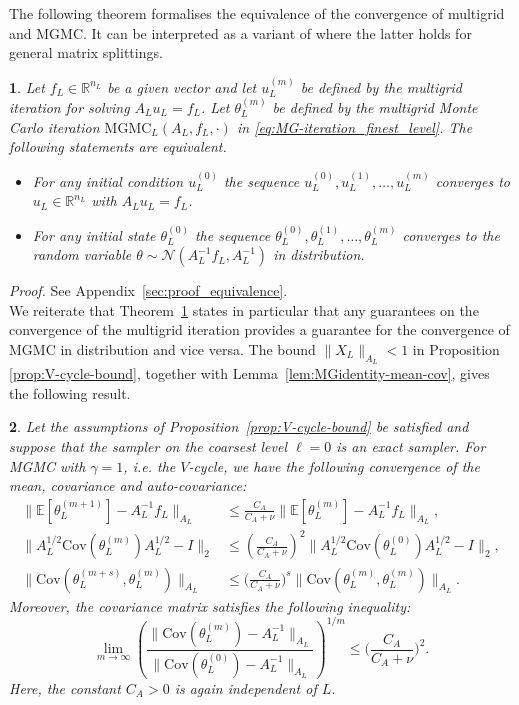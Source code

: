 \documentclass[11pt,english]{article}
\theoremstyle{plain}
\newtheorem{thm}{\protect\theoremname}[section]
\theoremstyle{plain}
\theoremstyle{plain}
\theoremstyle{plain}
\numberwithin{equation}{section}
\newcommand*{\id}{I}
\providecommand{\theoremname}{Theorem}
\begin{document}
The following theorem formalises the equivalence of the convergence of multigrid and MGMC. It can be interpreted as a variant of \cite[Theorem 1]{Fox.C_Parker_2017_AcceleratedGibbsSampling} where the latter holds for general matrix splittings.
\begin{thm}
	\label{thm:equivalence}Let $f_{L}\in\mathbb{R}^{n_{L}}$
	be a given vector and let $u_{L}^{(m)}$ be defined by the multigrid iteration for solving $A_{L}u_{L}=f_{L}$. Let $\theta_{L}^{(m)}$ be defined by the multigrid Monte Carlo iteration $\mathrm{MGMC}_{L}(A_{L},f_{L},\cdot)$ in \eqref{eq:MG-iteration_finest_level}.
	The following statements are equivalent.
	\begin{itemize}
		\item[(i)] For any initial condition $u_{L}^{(0)}$ the sequence $u_{L}^{(0)},u_{L}^{(1)},\dots,u_{L}^{(m)}$ converges to $u_{L}\in\mathbb{R}^{n_{L}}$ with $A_L u_{L}=f_L$.
		\item[(ii)] For any initial
			state $\theta_{L}^{(0)}$ the sequence $\theta_{L}^{(0)},\theta_{L}^{(1)},\dots,\theta_{L}^{(m)}$
			converges to the random variable $\theta\sim\mathcal{N}(A_L^{-1}f_L,A_L^{-1})$ in distribution.
	\end{itemize}
\end{thm}
\noindent\textit{Proof.} See Appendix~\ref{sec:proof_equivalence}.\\[1ex]
We reiterate that Theorem~\ref{thm:equivalence} states in particular that any guarantees on the  convergence of the multigrid iteration provides a guarantee for the convergence of MGMC in distribution and vice versa. The bound $\|X_{L}\|_{A_{L}}<1$ in Proposition \ref{prop:V-cycle-bound}, together with Lemma~\ref{lem:MGidentity-mean-cov}, gives the following result.
\begin{thm}
	\label{thm:moments-conv}Let the assumptions of Proposition\ \ref{prop:V-cycle-bound} be satisfied and suppose that the sampler on the coarsest level $\ell=0$ is an exact sampler. For MGMC with $\gamma=1$, i.e. the $V$-cycle, we have the following convergence of the mean, covariance and
	auto-covariance:
	\begin{align*}
		\|\mathbb{E}[\theta_{L}^{(m+1)}]-A_{L}^{-1}f_{L}\|_{A_{L}} & \leq\frac{C_{A}}{C_{A}+\nu}\|\mathbb{E}[\theta_{L}^{(m)}]-A_{L}^{-1}f_{L}\|_{A_{L}},             \\
		\|A_L^{1/2}\mathrm{Cov}(\theta_L^{(m)})A_L^{1/2}-\id\|_2 &\leq \left(\frac{C_{A}}{C_{A}+\nu}\right)^2 \|A_L^{1/2}\mathrm{Cov}(\theta_L^{(0)})A_L^{1/2}-\id\|_2,\\
		\|\mathrm{Cov}(\theta_{L}^{(m+s)},\theta_{L}^{(m)})\|_{A_{L}}       & \leq\biggl(\frac{C_{A}}{C_{A}+\nu}\biggr)^{s}\|\mathrm{Cov}(\theta_{L}^{(m)},\theta_{L}^{(m)})\|_{A_{L}}.
	\end{align*}
	Moreover, the covariance matrix satisfies the following inequality:
	\[
		\lim_{m\to\infty}\left(\frac{\|\mathrm{Cov}(\theta_{L}^{(m)})-A_{L}^{-1}\|_{A_{L}}}{\|\mathrm{Cov}(\theta_{L}^{(0)})-A_{L}^{-1}\|_{A_{L}}}\right)^{1/m}\leq\biggl(\frac{C_{A}}{C_{A}+\nu}\biggr)^{2}.
	\]
	Here, the constant $C_{A}>0$ is again independent of $L$.
\end{thm}
\end{document}
